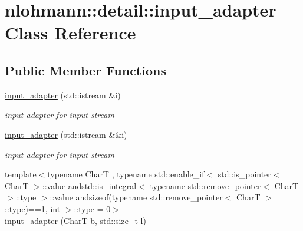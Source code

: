 \hypertarget{classnlohmann_1_1detail_1_1input__adapter}{}\section{nlohmann\+:\+:detail\+:\+:input\+\_\+adapter Class Reference}
\label{classnlohmann_1_1detail_1_1input__adapter}
\subsection*{Public Member Functions}
\begin{DoxyCompactItemize}
\item 
\hyperlink{classnlohmann_1_1detail_1_1input__adapter_ae89f11268d4724b3080473f7218abe86}{input\+\_\+adapter} (std\+::istream \&i)\hypertarget{classnlohmann_1_1detail_1_1input__adapter_ae89f11268d4724b3080473f7218abe86}{}\label{classnlohmann_1_1detail_1_1input__adapter_ae89f11268d4724b3080473f7218abe86}

\begin{DoxyCompactList}\small\item\em input adapter for input stream \end{DoxyCompactList}\item 
\hyperlink{classnlohmann_1_1detail_1_1input__adapter_af002dd2e53ac0855a03cb68d0ce626b2}{input\+\_\+adapter} (std\+::istream \&\&i)\hypertarget{classnlohmann_1_1detail_1_1input__adapter_af002dd2e53ac0855a03cb68d0ce626b2}{}\label{classnlohmann_1_1detail_1_1input__adapter_af002dd2e53ac0855a03cb68d0ce626b2}

\begin{DoxyCompactList}\small\item\em input adapter for input stream \end{DoxyCompactList}\item 
{\footnotesize template$<$typename CharT , typename std\+::enable\+\_\+if$<$ std\+::is\+\_\+pointer$<$ Char\+T $>$\+::value andstd\+::is\+\_\+integral$<$ typename std\+::remove\+\_\+pointer$<$ Char\+T $>$\+::type $>$\+::value andsizeof(typename std\+::remove\+\_\+pointer$<$ Char\+T $>$\+::type)==1, int $>$\+::type  = 0$>$ }\\\hyperlink{classnlohmann_1_1detail_1_1input__adapter_a37816622d79ab4a1a76f4d7e872b65e1}{input\+\_\+adapter} (CharT b, std\+::size\+\_\+t l)\hypertarget{classnlohmann_1_1detail_1_1input__adapter_a37816622d79ab4a1a76f4d7e872b65e1}{}\label{classnlohmann_1_1detail_1_1input__adapter_a37816622d79ab4a1a76f4d7e872b65e1}


\end{DoxyCompactItemize}
